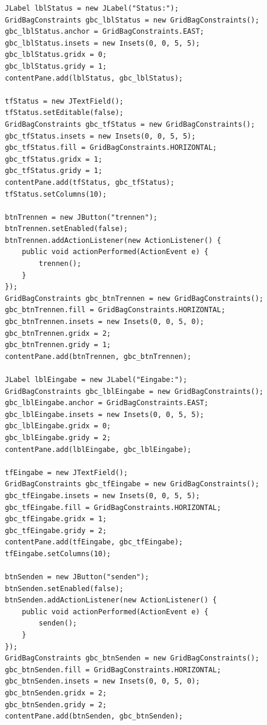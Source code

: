 \begin{lstlisting}
        JLabel lblStatus = new JLabel("Status:");
        GridBagConstraints gbc_lblStatus = new GridBagConstraints();
        gbc_lblStatus.anchor = GridBagConstraints.EAST;
        gbc_lblStatus.insets = new Insets(0, 0, 5, 5);
        gbc_lblStatus.gridx = 0;
        gbc_lblStatus.gridy = 1;
        contentPane.add(lblStatus, gbc_lblStatus);

        tfStatus = new JTextField();
        tfStatus.setEditable(false);
        GridBagConstraints gbc_tfStatus = new GridBagConstraints();
        gbc_tfStatus.insets = new Insets(0, 0, 5, 5);
        gbc_tfStatus.fill = GridBagConstraints.HORIZONTAL;
        gbc_tfStatus.gridx = 1;
        gbc_tfStatus.gridy = 1;
        contentPane.add(tfStatus, gbc_tfStatus);
        tfStatus.setColumns(10);

        btnTrennen = new JButton("trennen");
        btnTrennen.setEnabled(false);
        btnTrennen.addActionListener(new ActionListener() {
            public void actionPerformed(ActionEvent e) {
                trennen();
            }
        });
        GridBagConstraints gbc_btnTrennen = new GridBagConstraints();
        gbc_btnTrennen.fill = GridBagConstraints.HORIZONTAL;
        gbc_btnTrennen.insets = new Insets(0, 0, 5, 0);
        gbc_btnTrennen.gridx = 2;
        gbc_btnTrennen.gridy = 1;
        contentPane.add(btnTrennen, gbc_btnTrennen);

        JLabel lblEingabe = new JLabel("Eingabe:");
        GridBagConstraints gbc_lblEingabe = new GridBagConstraints();
        gbc_lblEingabe.anchor = GridBagConstraints.EAST;
        gbc_lblEingabe.insets = new Insets(0, 0, 5, 5);
        gbc_lblEingabe.gridx = 0;
        gbc_lblEingabe.gridy = 2;
        contentPane.add(lblEingabe, gbc_lblEingabe);

        tfEingabe = new JTextField();
        GridBagConstraints gbc_tfEingabe = new GridBagConstraints();
        gbc_tfEingabe.insets = new Insets(0, 0, 5, 5);
        gbc_tfEingabe.fill = GridBagConstraints.HORIZONTAL;
        gbc_tfEingabe.gridx = 1;
        gbc_tfEingabe.gridy = 2;
        contentPane.add(tfEingabe, gbc_tfEingabe);
        tfEingabe.setColumns(10);

        btnSenden = new JButton("senden");
        btnSenden.setEnabled(false);
        btnSenden.addActionListener(new ActionListener() {
            public void actionPerformed(ActionEvent e) {
                senden();
            }
        });
        GridBagConstraints gbc_btnSenden = new GridBagConstraints();
        gbc_btnSenden.fill = GridBagConstraints.HORIZONTAL;
        gbc_btnSenden.insets = new Insets(0, 0, 5, 0);
        gbc_btnSenden.gridx = 2;
        gbc_btnSenden.gridy = 2;
        contentPane.add(btnSenden, gbc_btnSenden);


\end{lstlisting}
